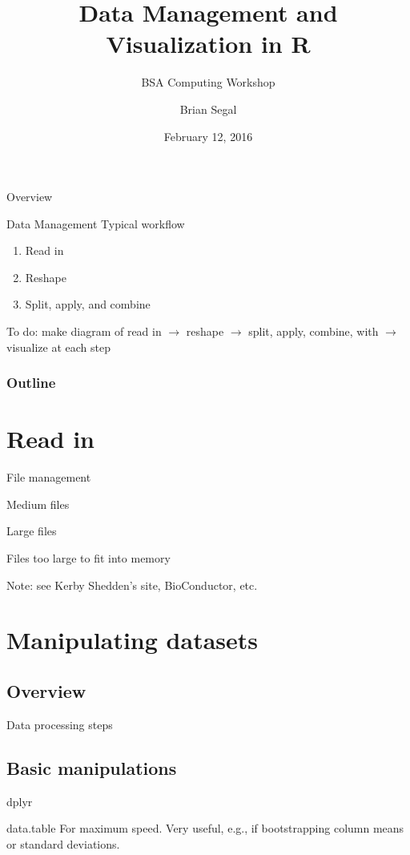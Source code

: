 \documentclass{beamer}
\title[]{Data Management and Visualization in \textsf{R}}
\subtitle{BSA Computing Workshop}
\author[]{Brian Segal}
\institute[]{Department of Biostatistics \\ University of Michigan}
\date{February 12, 2016}
\begin{document}
\begin{frame}
\titlepage
\end{frame}

\begin{frame}{Overview}
\begin{block}{Data Management}
Typical workflow
\begin{enumerate}
\item Read in
\item Reshape
\item Split, apply, and combine
\end{enumerate}
\end{block}
To do: make diagram of read in $\rightarrow$ reshape $\rightarrow$ split, apply, combine, with $\rightarrow$ visualize at each step
\end{frame}


\begin{frame}
\frametitle{Outline}
\tableofcontents[hideallsubsections]
\end{frame}

\section{Read in}

\begin{frame}{File management}
\end{frame}

\begin{frame}{Medium files}
\end{frame}

\begin{frame}{Large files}
\end{frame}

\begin{frame}{Files too large to fit into memory}

Note: see Kerby Shedden's site, BioConductor, etc.
\end{frame}

\section{Manipulating datasets}
\subsection{Overview}

\begin{frame}{Data processing steps}
\end{frame}

\subsection{Basic manipulations}
\begin{frame}{dplyr}
\end{frame}

\begin{frame}{data.table}
For maximum speed. Very useful, e.g., if bootstrapping column means or standard deviations.
\end{frame}
\end{document}
